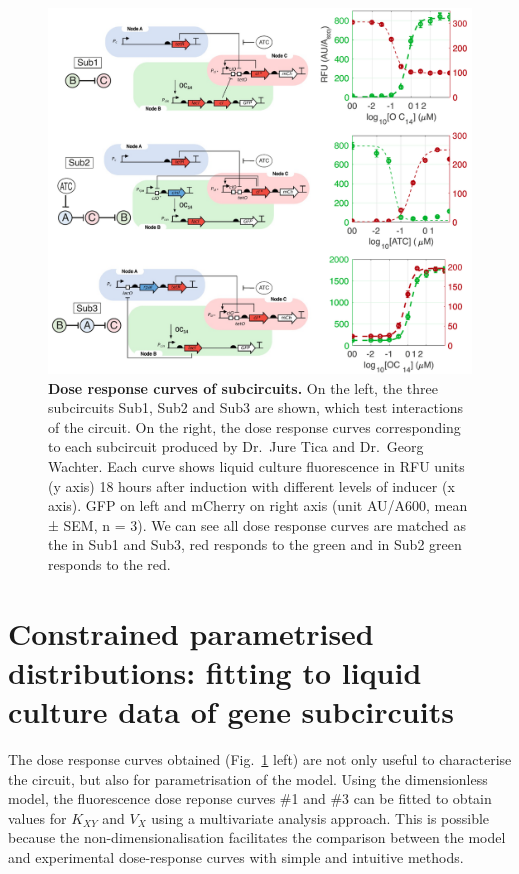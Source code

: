\begin{figure}[H] %
    \centering
    \begin{adjustbox}{center}
        \includegraphics[width=1\textwidth]{chapters/Chapter 2/dose_response_experimental} %
    \end{adjustbox}
    \caption{\textbf{Dose response curves of subcircuits.}
    On the left, the three subcircuits Sub1, Sub2 and Sub3 are shown, which test interactions of the circuit. On the right, the dose response curves corresponding to each subcircuit produced by Dr.~Jure Tica and Dr.~Georg Wachter. Each curve shows liquid culture fluorescence in RFU units (y axis) 18 hours after induction with different levels of inducer (x axis).
    GFP on left and mCherry on right axis (unit AU/A600, mean ± SEM, n = 3). We can see all dose response curves are matched as the in Sub1 and Sub3, red responds to the green and in Sub2 green responds to the red. }
    \label{fig:dose_response_experimental} %
\end{figure}
\section{Constrained parametrised distributions:
fitting to liquid culture data of gene subcircuits}\label{Constrained parametrised distributions: fitting to liquid culture data of gene subcircuits}
The dose response curves obtained (Fig.~\ref{fig:dose_response_experimental} left)
are not only useful to characterise the circuit,
but also for parametrisation of the model.
Using the dimensionless model,
the fluorescence dose reponse curves \#1 and \#3 can be fitted
to obtain values for $K_{XY}$ and $V_{X}$ using a multivariate analysis approach.
This is possible because the non-dimensionalisation facilitates the comparison between the model and experimental dose-response curves with simple and intuitive methods.


